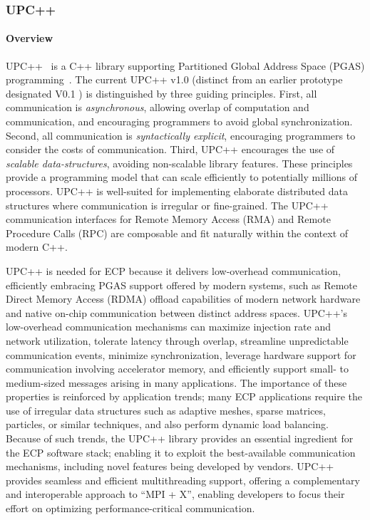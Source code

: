 \subsubsection{ UPC++\label{subsubsect:upcxx}} 
\paragraph{Overview} 

UPC++~\cite{upcxx-site} is a C++ library
supporting Partitioned Global Address Space (PGAS) programming~\cite{upcxx-ipdps19,upcxx-guide,upcxx-spec}.
The current UPC++ v1.0 (distinct from an earlier prototype designated V0.1
\cite{zheng:ipdps14}) is distinguished by three guiding principles.
First, all communication is \emph{asynchronous}, allowing overlap of computation and
communication, and encouraging programmers to avoid global synchronization. Second, all communication
is \emph{syntactically explicit}, encouraging programmers to consider the costs of communication. Third,
UPC++ encourages the use of \emph{scalable data-structures},
avoiding non-scalable library features.
These principles provide a programming model that can
scale efficiently to potentially millions of processors.
UPC++ is well-suited for implementing elaborate distributed data structures where
communication is irregular or fine-grained. 
The UPC++ communication interfaces for Remote Memory Access (RMA) 
and Remote Procedure Calls (RPC)
are composable and fit naturally within the context of modern C++.

UPC++ is needed for ECP because it delivers low-overhead communication,
efficiently embracing PGAS support offered by modern systems,
such as Remote Direct Memory Access (RDMA) offload capabilities of modern
network hardware and native on-chip communication between distinct address
spaces.  
UPC++'s low-overhead communication mechanisms can maximize injection rate and
network utilization, tolerate latency through overlap, streamline unpredictable
communication events, minimize synchronization, leverage hardware support for
communication involving accelerator memory, and efficiently support small- to
medium-sized messages arising in many applications.
The importance of these properties is reinforced by application trends; many
ECP applications require the use of irregular data structures such as adaptive
meshes, sparse matrices, particles, or similar techniques, and also perform
dynamic load balancing.
Because of such trends, the UPC++ library provides an essential ingredient for
the ECP software stack; enabling it to exploit the best-available communication
mechanisms, including novel features being developed by vendors.  UPC++
provides seamless and efficient multithreading support, offering a
complementary and interoperable approach to ``MPI + X'', enabling developers to
focus their effort on optimizing performance-critical communication.

